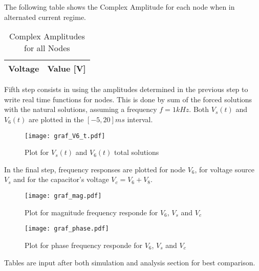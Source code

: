 \par
\par
The following table shows the Complex Amplitude for each node when in alternated current regime.
\par
\par
\begin{table}[H]
  \centering
  \begin{tabular}{|l|r|}
    \hline    
    {\bf Voltage} & {\bf Value [V]} \\ \hline
    
  \end{tabular}
  \caption{Complex Amplitudes for all Nodes}
  \label{tab:tcamp}
\end{table}

Fifth step consists in using the amplitudes determined in the previous step to write real time functions for nodes. This is done by sum of the forced solutions with the natural solutions, assuming a frequency $f=1kHz$. Both $V_s(t)$ and $V_6(t)$ are plotted in the $[-5, 20]ms$ interval.
\begin{figure}[h] \centering
\texttt{[image: graf\_V6\_t.pdf]}
\caption{Plot for $V_s(t)$ and $V_6(t)$ total solutions}
\end{figure}

In the final step, frequency responses are plotted for node $V_6$, for voltage source $V_s$ and for the capacitor's voltage $V_c=V_6+V_8$. 
\begin{figure}[h] \centering
\texttt{[image: graf\_mag.pdf]}
\caption{Plot for magnitude frequency responde for $V_6$, $V_s$ and $V_c$}
\end{figure}
\begin{figure}[h] \centering
\texttt{[image: graf\_phase.pdf]}
\caption{Plot for phase frequency responde for $V_6$, $V_s$ and $V_c$}
\end{figure}
Tables are input after both simulation and analysis section for best comparison.
